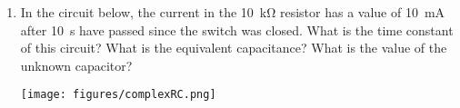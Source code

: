 \begin{enumerate}
\clearpage
\item
In the circuit below, the current in the \SI{10}{\kilo\ohm} resistor has a value of \SI{10}{\milli\ampere} after \SI{10}{\second} have passed since the switch was closed. What is the time constant of this circuit? What is the equivalent capacitance? What is the value of the unknown capacitor?

\texttt{[image: figures/complexRC.png]}




\newpage 

\ %

\newpage

\end{enumerate}